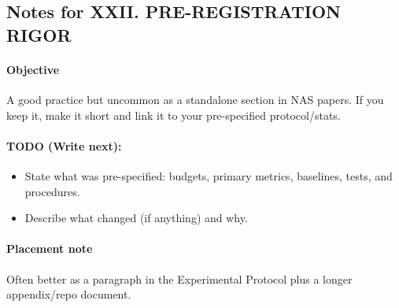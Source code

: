 \subsection*{Notes for XXII. PRE-REGISTRATION RIGOR}
\paragraph{Objective}
A good practice but uncommon as a standalone section in NAS papers. If you keep it, make it short and link it to your pre-specified protocol/stats.

\paragraph{TODO (Write next):}
\begin{itemize}
  \item State what was pre-specified: budgets, primary metrics, baselines, tests, and procedures.
  \item Describe what changed (if anything) and why.
\end{itemize}

\paragraph{Placement note}
Often better as a paragraph in the Experimental Protocol plus a longer appendix/repo document.
